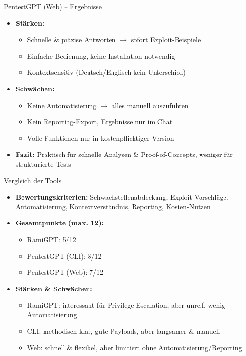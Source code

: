 \documentclass[
	aspectratio=169,	%
	onlytextwidth,		%
	t,					%
	]{beamer}
\begin{document}
\begin{frame}{PentestGPT (Web) – Ergebnisse}
	\begin{itemize}
		\item \textbf{Stärken:}
		\begin{itemize}
			\item Schnelle \& präzise Antworten $\rightarrow$ sofort Exploit-Beispiele
			\item Einfache Bedienung, keine Installation notwendig
			\item Kontextsensitiv (Deutsch/Englisch kein Unterschied)
		\end{itemize}
		
		\item \textbf{Schwächen:}
		\begin{itemize}
			\item Keine Automatisierung $\rightarrow$ alles manuell auszuführen
			\item Kein Reporting-Export, Ergebnisse nur im Chat
			\item Volle Funktionen nur in kostenpflichtiger Version
		\end{itemize}
		
		\item \textbf{Fazit:}  
		Praktisch für schnelle Analysen \& Proof-of-Concepts, weniger für strukturierte Tests
	\end{itemize}
\end{frame}

\begin{frame}{Vergleich der Tools}
	\begin{itemize}
		\item \textbf{Bewertungskriterien:}  
		Schwachstellenabdeckung, Exploit-Vorschläge, Automatisierung, Kontextverständnis, Reporting, Kosten-Nutzen
		
		\item \textbf{Gesamtpunkte (max. 12):}
		\begin{itemize}
			\item RamiGPT: 5/12
			\item PentestGPT (CLI): 8/12
			\item PentestGPT (Web): 7/12
		\end{itemize}
		
		\item \textbf{Stärken \& Schwächen:}
		\begin{itemize}
			\item RamiGPT: interessant für Privilege Escalation, aber unreif, wenig Automatisierung
			\item CLI: methodisch klar, gute Payloads, aber langsamer \& manuell
			\item Web: schnell \& flexibel, aber limitiert ohne Automatisierung/Reporting
		\end{itemize}
	\end{itemize}
\end{frame}
\end{document}
